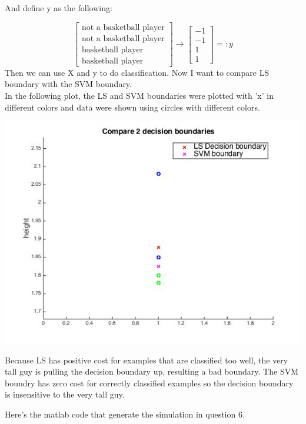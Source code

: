 \documentclass[paper=a4, fontsize=11pt]{scrartcl} %
\numberwithin{equation}{section} %
\numberwithin{figure}{section} %
\numberwithin{table}{section} %
\begin{document}
And define y as the following: 

$$
\begin{bmatrix}
\text{not a basketball player}	\\
\text{not a basketball player}	\\
\text{basketball player} 	\\
\text{basketball player}
\end{bmatrix}
\rightarrow
\begin{bmatrix}
-1		\\
-1		\\
1	 	\\
1
\end{bmatrix}
=: y
$$
Then we can use X and y to do classification. Now I want to compare LS boundary with the SVM boundary. \\

In the following plot, the LS and SVM boundaries were plotted with 'x' in different colors and data were shown using circles with different colors. 

\begin{center}
\includegraphics[scale=.5]{hw8_6_2boundaries.jpg}
\end{center}

Because LS has positive cost for examples that are classified too well, the very tall guy is pulling the decision boundary up, resulting a bad boundary. The SVM boundry has zero cost for correctly classified examples so the decision boundary is insensitive to the very tall guy. 

\newpage

Here's the matlab code that generate the simulation in question 6. 
\end{document}
